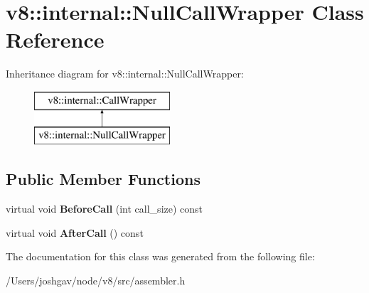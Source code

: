 \hypertarget{classv8_1_1internal_1_1_null_call_wrapper}{}\section{v8\+:\+:internal\+:\+:Null\+Call\+Wrapper Class Reference}
\label{classv8_1_1internal_1_1_null_call_wrapper}
Inheritance diagram for v8\+:\+:internal\+:\+:Null\+Call\+Wrapper\+:\begin{figure}[H]
\begin{center}
\leavevmode
\includegraphics[height=2.000000cm]{classv8_1_1internal_1_1_null_call_wrapper}
\end{center}
\end{figure}
\subsection*{Public Member Functions}
\begin{DoxyCompactItemize}
\item 
virtual void {\bfseries Before\+Call} (int call\+\_\+size) const \hypertarget{classv8_1_1internal_1_1_null_call_wrapper_a8133e814e321855a1d659ca1b7cf9470}{}\label{classv8_1_1internal_1_1_null_call_wrapper_a8133e814e321855a1d659ca1b7cf9470}

\item 
virtual void {\bfseries After\+Call} () const \hypertarget{classv8_1_1internal_1_1_null_call_wrapper_af40a848b231cfb25475917ef17697371}{}\label{classv8_1_1internal_1_1_null_call_wrapper_af40a848b231cfb25475917ef17697371}

\end{DoxyCompactItemize}


The documentation for this class was generated from the following file\+:\begin{DoxyCompactItemize}
\item 
/\+Users/joshgav/node/v8/src/assembler.\+h\end{DoxyCompactItemize}
